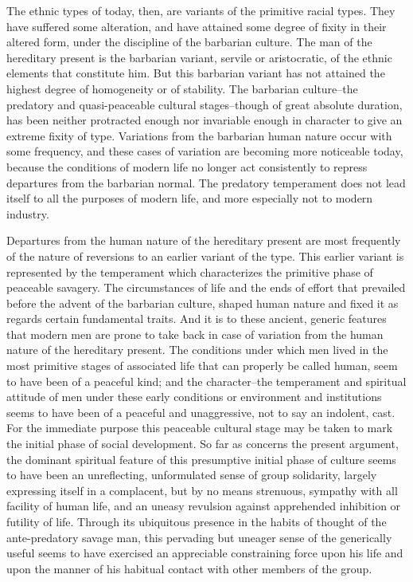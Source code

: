 \documentclass[12pt]{report}
\begin{document}
The ethnic types of today, then, are variants of the primitive racial
types. They have suffered some alteration, and have attained some degree
of fixity in their altered form, under the discipline of the barbarian
culture. The man of the hereditary present is the barbarian variant,
servile or aristocratic, of the ethnic elements that constitute him.
But this barbarian variant has not attained the highest degree of
homogeneity or of stability. The barbarian culture--the predatory and
quasi-peaceable cultural stages--though of great absolute duration, has
been neither protracted enough nor invariable enough in character to
give an extreme fixity of type. Variations from the barbarian human
nature occur with some frequency, and these cases of variation are
becoming more noticeable today, because the conditions of modern life no
longer act consistently to repress departures from the barbarian normal.
The predatory temperament does not lead itself to all the purposes of
modern life, and more especially not to modern industry.

Departures from the human nature of the hereditary present are most
frequently of the nature of reversions to an earlier variant of the
type. This earlier variant is represented by the temperament
which characterizes the primitive phase of peaceable savagery. The
circumstances of life and the ends of effort that prevailed before the
advent of the barbarian culture, shaped human nature and fixed it as
regards certain fundamental traits. And it is to these ancient, generic
features that modern men are prone to take back in case of variation
from the human nature of the hereditary present. The conditions under
which men lived in the most primitive stages of associated life that can
properly be called human, seem to have been of a peaceful kind; and the
character--the temperament and spiritual attitude of men under these
early conditions or environment and institutions seems to have been of
a peaceful and unaggressive, not to say an indolent, cast. For the
immediate purpose this peaceable cultural stage may be taken to mark
the initial phase of social development. So far as concerns the present
argument, the dominant spiritual feature of this presumptive initial
phase of culture seems to have been an unreflecting, unformulated sense
of group solidarity, largely expressing itself in a complacent, but by
no means strenuous, sympathy with all facility of human life, and an
uneasy revulsion against apprehended inhibition or futility of life.
Through its ubiquitous presence in the habits of thought of the
ante-predatory savage man, this pervading but uneager sense of the
generically useful seems to have exercised an appreciable constraining
force upon his life and upon the manner of his habitual contact with
other members of the group.
\end{document}
